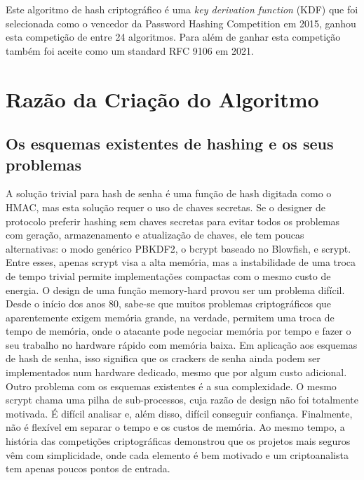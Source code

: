 \documentclass[conference]{IEEEtran}
\begin{document}
Este algoritmo de hash criptográfico é uma \textit{key derivation function} (KDF) que foi 
selecionada como o vencedor da Password Hashing Competition \cite{phc} em 2015, 
ganhou esta competição de entre 24 algoritmos. Para além de ganhar esta 
competição também foi aceite como um standard RFC 9106 \cite{rfc9106} em 2021.


\section{Razão da Criação do Algoritmo}

\subsection{Os esquemas existentes de hashing e os seus problemas}

A solução trivial para hash de senha é uma função de hash digitada como o HMAC, 
mas esta solução requer o uso de chaves secretas. Se o designer de protocolo 
preferir hashing sem chaves secretas para evitar todos os problemas com geração, 
armazenamento e atualização de chaves, ele tem poucas alternativas: 
o modo genérico PBKDF2, o bcrypt baseado no Blowfish, e scrypt. Entre esses, 
apenas scrypt visa a alta memória, mas a instabilidade de uma troca de tempo 
trivial permite implementações compactas com o mesmo custo de energia. 
O design de uma função memory-hard provou ser um problema difícil. Desde o 
início dos anos 80, sabe-se que muitos problemas criptográficos que 
aparentemente exigem memória grande, na verdade, permitem uma troca de 
tempo de memória, onde o atacante pode negociar memória por tempo e 
fazer o seu trabalho no hardware rápido com memória baixa. Em aplicação aos 
esquemas de hash de senha, isso significa que os crackers de senha ainda podem 
ser implementados num hardware dedicado, mesmo que por algum custo adicional. 
Outro problema com os esquemas existentes é a sua complexidade. O mesmo scrypt 
chama uma pilha de sub-processos, cuja razão de design não foi totalmente motivada. 
É difícil analisar e, além disso, difícil conseguir confiança. Finalmente, 
não é flexível em separar o tempo e os custos de memória. Ao mesmo tempo, 
a história das competições criptográficas demonstrou que os projetos mais 
seguros vêm com simplicidade, onde cada elemento é bem motivado e um 
criptoanalista tem apenas poucos pontos de entrada. 
\end{document}
